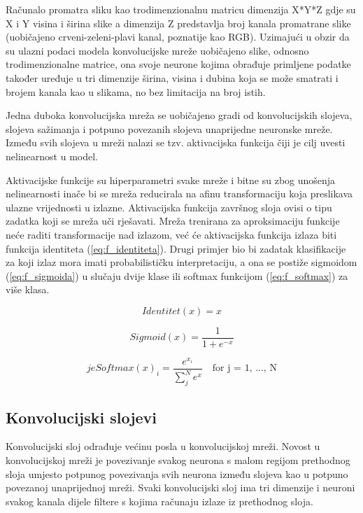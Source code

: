 \documentclass[times, utf8, proizvoljni, numeric]{fer}
\begin{document}
Računalo promatra sliku kao trodimenzionalnu matricu dimenzija X*Y*Z gdje su X i Y visina i širina slike a dimenzija Z predstavlja broj kanala promatrane slike (uobičajeno crveni-zeleni-plavi kanal, poznatije kao RGB). Uzimajući u obzir da su ulazni podaci modela konvolucijske mreže uobičajeno slike, odnosno trodimenzionalne matrice, ona svoje neurone kojima obrađuje primljene podatke također uređuje u tri dimenzije širina, visina i dubina koja se može smatrati i brojem kanala kao u slikama, no bez limitacija na broj istih.

Jedna duboka konvolucijska mreža se uobičajeno gradi od konvolucijskih slojeva, slojeva sažimanja i potpuno povezanih slojeva unaprijedne neuronske mreže. Između svih slojeva u mreži nalazi se tzv. aktivacijska funkcija čiji je cilj uvesti nelinearnost u model.

Aktivacijske funkcije su hiperparametri svake mreže i bitne su zbog unošenja nelinearnosti inače bi se mreža reducirala na afinu transformaciju koja preslikava ulazne vrijednosti u izlazne.  Aktivacijska funkcija završnog sloja ovisi o tipu zadatka koji se mreža uči rješavati. Mreža trenirana za aproksimaciju funkcije neće raditi transformacije nad izlazom, već će aktivacijska funkcija izlaza biti funkcija identiteta (\ref{eq:f_identiteta}). Drugi primjer bio bi zadatak klasifikacije za koji izlaz mora imati probabilističku interpretaciju, a ona se postiže sigmoidom (\ref{eq:f_sigmoida}) u slučaju dvije klase ili softmax funkcijom (\ref{eq:f_softmax}) za više klasa. 

\begin{equation}
\label{eq:f_identiteta}
Identitet(x) = x   
\end{equation}

\begin{equation}
\label{eq:f_sigmoida}
Sigmoid(x) = \frac{1}{1+e^{-x}}    
\end{equation}

\begin{equation}
\label{eq:f_softmax}je
Softmax(x)_i = \frac{e^{x_i}}{\sum_{j}^{N}e^{x}} \quad \text{for j = 1, ..., N}
\end{equation}


\subsection{Konvolucijski slojevi}


Konvolucijski sloj odrađuje većinu posla u konvolucijskoj mreži. Novost u konvolucijskoj mreži je povezivanje svakog neurona s malom regijom prethodnog sloja umjesto potpunog povezivanja svih neurona između slojeva kao u potpuno povezanoj unaprijednoj mreži. Svaki konvolucijski sloj ima tri dimenzije i neuroni svakog kanala dijele filtere s kojima računaju izlaze iz prethodnog sloja.
\end{document}
